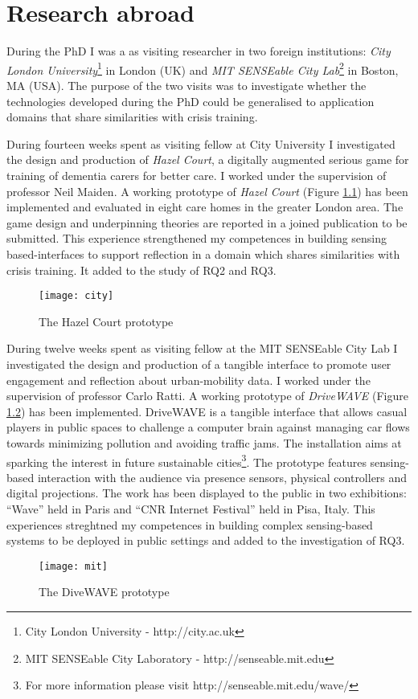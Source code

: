 \chapter{Research abroad}\label{abroad}

During the PhD I was a as visiting researcher in two foreign institutions: \emph{City London University}\footnote{City London University - http://city.ac.uk} in London (UK) and \emph{MIT SENSEable City Lab}\footnote{MIT SENSEable City Laboratory - http://senseable.mit.edu} in Boston, MA (USA). The purpose of the two visits was to investigate whether the technologies developed during the PhD could be generalised to application domains that share similarities with crisis training.

During fourteen weeks spent as visiting fellow at City University I investigated the design and production of \emph{Hazel Court}, a digitally augmented serious game for training of dementia carers for better care. I worked under the supervision of professor Neil Maiden. A working prototype of \emph{Hazel Court} (Figure \ref{fig:hazel-court}) has been implemented and evaluated in eight care homes in the greater London area. The game design and underpinning theories are reported in a joined publication to be submitted. This experience strengthened my competences in building sensing based-interfaces to support reflection in a domain which shares similarities with crisis training. It added to the study of RQ2 and RQ3.
\begin{figure}
	[h] \centering 
	\texttt{[image: city]} \caption{The Hazel Court prototype} \label{fig:hazel-court} 
\end{figure}

During twelve weeks spent as visiting fellow at the MIT SENSEable City Lab I investigated the design and production of a tangible interface to promote user engagement and reflection about urban-mobility data. I worked under the supervision of professor Carlo Ratti. A working prototype of \emph{DriveWAVE} (Figure \ref{fig:drivewave}) has been implemented. DriveWAVE is a tangible interface that allows casual players in public spaces to challenge a computer brain against managing car flows towards minimizing pollution and avoiding traffic jams. The installation aims at sparking the interest in future sustainable cities\footnote{For more information please visit http://senseable.mit.edu/wave/}. The prototype features sensing-based interaction with the audience via presence sensors, physical controllers and digital projections. The work has been displayed to the public in two exhibitions: ``Wave'' held in Paris and ``CNR Internet Festival'' held in Pisa, Italy. This experiences streghtned my competences in building complex sensing-based systems to be deployed in public settings and added to the investigation of RQ3.
\begin{figure}
	[h] \centering 
	\texttt{[image: mit]} \caption{The DiveWAVE prototype} \label{fig:drivewave} 
\end{figure}